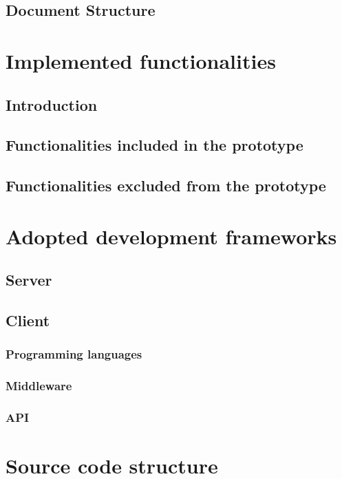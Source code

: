     \section{Document Structure}
    	
    
\newpage
\chapter{Implemented functionalities}
    \section{Introduction}
    	
    \section{Functionalities included in the prototype}
    \section{Functionalities excluded from the prototype}
    
\newpage
\chapter{Adopted development frameworks}
    \section{Server}
    	
    \section{Client}
	    \subsection{Programming languages}
	    \subsection{Middleware}
	    \subsection{API}

\newpage
\chapter{Source code structure}
